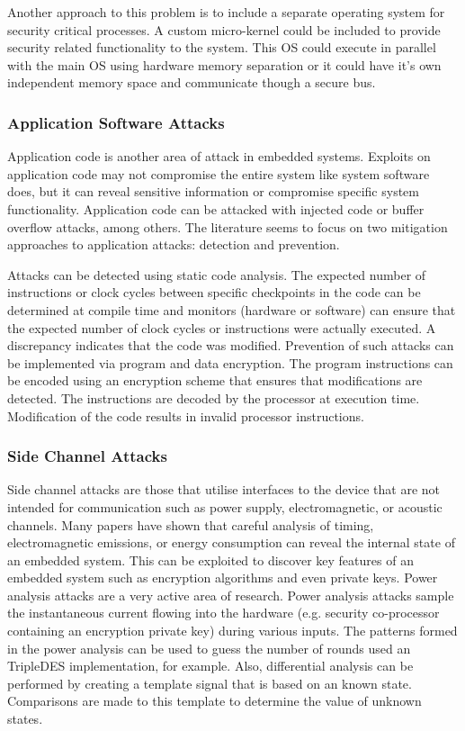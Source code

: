 \documentclass[final,conference,11pt]{IEEEtran}
\begin{document}
Another approach to this problem is to include a separate operating system for security critical processes.  A custom micro-kernel could be included to provide security related functionality to the system.  This OS could execute in parallel with the main OS using hardware memory separation or it could have it's own independent memory space and communicate though a secure bus.\cite{novelOS}

\subsubsection{Application Software Attacks}

Application code is another area of attack in embedded systems.  Exploits on application code may not compromise the entire system like system software does, but it can reveal sensitive information or compromise specific system functionality.  Application code can be attacked with injected code or buffer overflow attacks, among others.  The literature seems to focus on two mitigation approaches to application attacks: detection and prevention.  

Attacks can be detected using static code analysis.  The expected number of instructions or clock cycles between specific checkpoints in the code can be determined at compile time and monitors (hardware or software) can ensure that the expected number of clock cycles or instructions were actually executed.  A discrepancy indicates that the code was modified.  Prevention of such attacks can be implemented via program and data encryption.  The program instructions can be encoded using an encryption scheme that ensures that modifications are detected.  The instructions are decoded by the processor at execution time.  Modification of the code results in invalid processor instructions. \cite{compiler-hardware} \cite{architectural-frameworks}

\subsubsection{Side Channel Attacks}
Side channel attacks are those that utilise interfaces to the device that are not intended for communication such as power supply, electromagnetic, or acoustic channels.  Many papers have shown that careful analysis of timing, electromagnetic emissions, or energy consumption can reveal the internal state of an embedded system. \cite{papers??} This can be exploited to discover key features of an embedded system such as encryption algorithms and even private keys.  Power analysis attacks are a very active area of research.  Power analysis attacks sample the instantaneous current flowing into the hardware (e.g. security co-processor containing an encryption private key) during various inputs.  The patterns formed in the power analysis can be used to guess the number of rounds used an TripleDES implementation, for example.  Also, differential analysis can be performed by creating a template signal that is based on an known state.  Comparisons are made to this template to determine the value of unknown states.  
\end{document}
